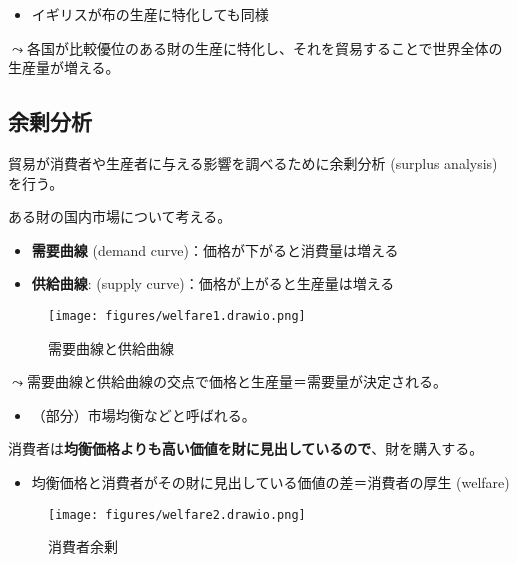 \documentclass[
  xelatex,
  ja=standard]{bxjsarticle}
\providecommand{\tightlist}{%
  \setlength{\itemsep}{0pt}\setlength{\parskip}{0pt}}\usepackage{longtable,booktabs,array}
\begin{document}
\begin{itemize}
\tightlist
\item
  イギリスが布の生産に特化しても同様
\end{itemize}

\(\leadsto\)各国が比較優位のある財の生産に特化し、それを貿易することで世界全体の生産量が増える。

\hypertarget{ux4f59ux5270ux5206ux6790}{%
\subsection{余剰分析}\label{ux4f59ux5270ux5206ux6790}}

貿易が消費者や生産者に与える影響を調べるために余剰分析 (surplus
analysis) を行う。

ある財の国内市場について考える。

\begin{itemize}
\tightlist
\item
  \textbf{需要曲線} (demand curve)：価格が下がると消費量は増える
\item
  \textbf{供給曲線}: (supply curve)：価格が上がると生産量は増える
\end{itemize}

\begin{figure}[htpb]

{\centering \texttt{[image: figures/welfare1.drawio.png]}

}

\caption{需要曲線と供給曲線}

\end{figure}

\(\leadsto\)需要曲線と供給曲線の交点で価格と生産量＝需要量が決定される。

\begin{itemize}
\tightlist
\item
  （部分）市場均衡などと呼ばれる。
\end{itemize}

消費者は\textbf{均衡価格よりも高い価値を財に見出しているので}、財を購入する。

\begin{itemize}
\tightlist
\item
  均衡価格と消費者がその財に見出している価値の差＝消費者の厚生 (welfare)
\end{itemize}

\begin{figure}[htpb]

{\centering \texttt{[image: figures/welfare2.drawio.png]}

}

\caption{消費者余剰}

\end{figure}
\end{document}
